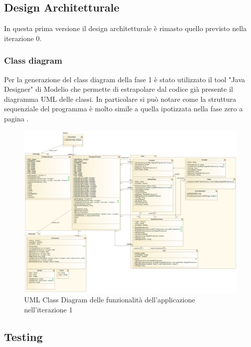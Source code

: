 \documentclass[12pt]{article}
\begin{document}
\subsection{Design Architetturale}
In questa prima versione il design architetturale è rimasto quello previsto nella iterazione 0.
\subsubsection{Class diagram}
Per la generazione del class diagram della fase 1 è stato utilizzato il tool "Java Designer" di Modelio che permette di estrapolare dal codice già presente il diagramma UML delle classi.
In particolare si può notare come la struttura sequenziale del programma è molto simile a quella ipotizzata nella fase zero a pagina \pageref{bozzaArc}.

\begin{figure}\label{rifUMLV1}
\centering
\includegraphics[scale=0.4]{immagini/UMLV1.png}
\caption{UML Class Diagram delle funzionalità dell'applicazione nell'iterazione 1}
\end{figure}
\pagebreak

\subsection{Testing}
\end{document}
